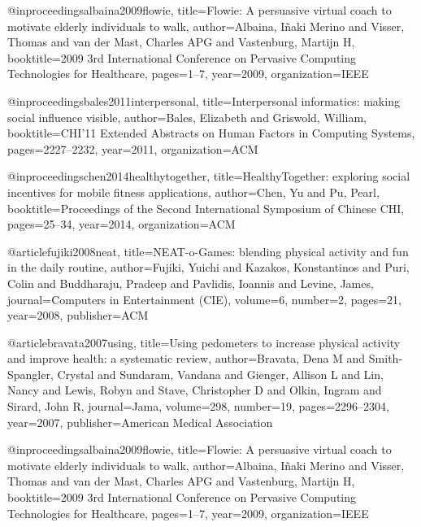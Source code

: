 





@inproceedings{albaina2009flowie,
  title={Flowie: A persuasive virtual coach to motivate elderly individuals to walk},
  author={Albaina, I{\~n}aki Merino and Visser, Thomas and van der Mast, Charles APG and Vastenburg, Martijn H},
  booktitle={2009 3rd International Conference on Pervasive Computing Technologies for Healthcare},
  pages={1--7},
  year={2009},
  organization={IEEE}
}



@inproceedings{bales2011interpersonal,
  title={Interpersonal informatics: making social influence visible},
  author={Bales, Elizabeth and Griswold, William},
  booktitle={CHI'11 Extended Abstracts on Human Factors in Computing Systems},
  pages={2227--2232},
  year={2011},
  organization={ACM}
}

@inproceedings{chen2014healthytogether,
  title={HealthyTogether: exploring social incentives for mobile fitness applications},
  author={Chen, Yu and Pu, Pearl},
  booktitle={Proceedings of the Second International Symposium of Chinese CHI},
  pages={25--34},
  year={2014},
  organization={ACM}
}

@article{fujiki2008neat,
  title={NEAT-o-Games: blending physical activity and fun in the daily routine},
  author={Fujiki, Yuichi and Kazakos, Konstantinos and Puri, Colin and Buddharaju, Pradeep and Pavlidis, Ioannis and Levine, James},
  journal={Computers in Entertainment (CIE)},
  volume={6},
  number={2},
  pages={21},
  year={2008},
  publisher={ACM}
}


@article{bravata2007using,
  title={Using pedometers to increase physical activity and improve health: a systematic review},
  author={Bravata, Dena M and Smith-Spangler, Crystal and Sundaram, Vandana and Gienger, Allison L and Lin, Nancy and Lewis, Robyn and Stave, Christopher D and Olkin, Ingram and Sirard, John R},
  journal={Jama},
  volume={298},
  number={19},
  pages={2296--2304},
  year={2007},
  publisher={American Medical Association}
}

@inproceedings{albaina2009flowie,
  title={Flowie: A persuasive virtual coach to motivate elderly individuals to walk},
  author={Albaina, I{\~n}aki Merino and Visser, Thomas and van der Mast, Charles APG and Vastenburg, Martijn H},
  booktitle={2009 3rd International Conference on Pervasive Computing Technologies for Healthcare},
  pages={1--7},
  year={2009},
  organization={IEEE}
}


